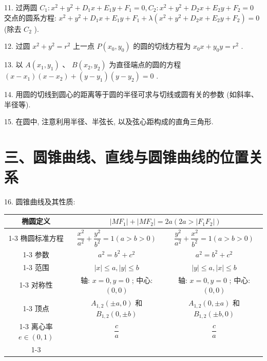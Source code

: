 11. 过两圆 ${C}_{1} : {x}^{2} + {y}^{2} + {D}_{1}x + {E}_{1}y + {F}_{1} = 0,{C}_{2} : {x}^{2} + {y}^{2} + {D}_{2}x + {E}_{2}y + {F}_{2} = 0$ 交点的圆系方程: ${x}^{2} +  {y}^{2} + {D}_{1}x + {E}_{1}y + {F}_{1} + \lambda \left( {{x}^{2} + {y}^{2} + {D}_{2}x + {E}_{2}y + {F}_{2}}\right)  = 0$ (除去 ${C}_{2}$ ).

12. 过圆 ${x}^{2} + {y}^{2} = {r}^{2}$ 上一点 $P\left( {{x}_{0},{y}_{0}}\right)$ 的圆的切线方程为 ${x}_{0}x + {y}_{0}y = {r}^{2}$ .

13. 以 $A\left( {{x}_{1},{y}_{1}}\right)$ 、 $B\left( {{x}_{2},{y}_{2}}\right)$ 为直径端点的圆的方程 $\left( {x - {x}_{1}}\right) \left( {x - {x}_{2}}\right)  + \left( {y - {y}_{1}}\right) \left( {y - {y}_{2}}\right)  = 0$ .

14. 用圆的切线到圆心的距离等于圆的半径可求与切线或圆有关的参数 (如斜率、半径等).

15. 在圆中, 注意利用半径、半弦长, 以及弦心距构成的直角三角形.

\section*{三、圆锥曲线、直线与圆锥曲线的位置关系}

16. 圆锥曲线及其性质:

\begin{center}
\begin{tabular}{|c|c|c|}
\hline
椭圆定义 & \multicolumn{2}{|c|}{$\left| {M{F}_{1}}\right|  + \left| {M{F}_{2}}\right|  = {2a}\left( {{2a} > \left| {{F}_{1}{F}_{2}}\right| }\right)$} \\
\cline{1-3}
椭圆标准方程 & $\dfrac{{x}^{2}}{{a}^{2}} + \dfrac{{y}^{2}}{{b}^{2}} = 1\left( {a > b > 0}\right)$ & $\dfrac{{y}^{2}}{{a}^{2}} + \dfrac{{x}^{2}}{{b}^{2}} = 1\left( {a > b > 0}\right)$ \\
\cline{1-3}
参数 & ${a}^{2} = {b}^{2} + {c}^{2}$ & ${a}^{2} = {b}^{2} + {c}^{2}$ \\
\cline{1-3}
范围 & $\left| x\right|  \leq  a,\left| y\right|  \leq  b$ & $\left| y\right|  \leq  a,\left| x\right|  \leq  b$ \\
\cline{1-3}
对称性 & 轴: $x = 0,y = 0$ ; 中心: $\left( {0,0}\right)$ & 轴: $x = 0,y = 0$ ; 中心: $\left( {0,0}\right)$ \\
\cline{1-3}
顶点 & ${A}_{1,2}\left( {\pm a,0}\right)$ 和 ${B}_{1,2}\left( {0, \pm  b}\right)$ & ${A}_{1,2}\left( {0, \pm  a}\right)$ 和 ${B}_{1,2}\left( {\pm b,0}\right)$ \\
\cline{1-3}
离心率 $e \in  \left( {0,1}\right)$ & $\dfrac{c}{a}$ & $\dfrac{c}{a}$ \\
\cline{1-3}
\hline
\end{tabular}
\end{center}

